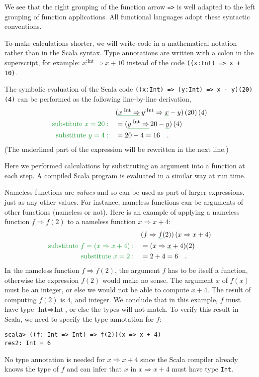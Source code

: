 We see that the right grouping of the function arrow \lstinline!=>!
is well adapted to the left grouping of function applications. All
functional languages adopt these syntactic conventions.

To make calculations shorter, we will write code in a mathematical
notation rather than in the Scala syntax. Type annotations are written
with a colon in the superscript, for example: $x^{:\text{Int}}\Rightarrow x+10$
instead of the code \lstinline!((x:Int) => x + 10)!.

The symbolic evaluation of the Scala code \lstinline!((x:Int) => (y:Int) => x - y)(20)(4)!
can be performed as the following line-by-line derivation,
\begin{align*}
 & (\gunderline{x^{:\text{Int}}\Rightarrow}\,y^{:\text{Int}}\Rightarrow\gunderline x-y)\left(20\right)\left(4\right)\\
{\color{greenunder}\text{substitute }x=20:}\quad & =(\gunderline{y^{:\text{Int}}\Rightarrow}\,20-\gunderline y)\left(4\right)\\
{\color{greenunder}\text{substitute }y=4:}\quad & =20-4=16\quad.
\end{align*}
(The underlined part of the expression will be rewritten in the next
line.)

Here we performed calculations by substituting an argument into a
function at each step. A compiled Scala program is evaluated in a
similar way at run time.

Nameless functions are \emph{values} and so can be used as part of
larger expressions, just as any other values. For instance, nameless
functions can be arguments of other functions (nameless or not). Here
is an example of applying a nameless function $f\Rightarrow f(2)$
to a nameless function $x\Rightarrow x+4$:
\begin{align*}
 & (f\Rightarrow\gunderline f(2))\left(x\Rightarrow x+4\right)\\
{\color{greenunder}\text{substitute }f=\left(x\Rightarrow x+4\right):}\quad & =(x\Rightarrow\gunderline x+4)(2)\\
{\color{greenunder}\text{substitute }x=2:}\quad & =2+4=6\quad.
\end{align*}
In the nameless function $f\Rightarrow f(2)$, the argument $f$ has
to be itself a function, otherwise the expression $f(2)$ would make
no sense. The argument $x$ of $f(x)$ must be an integer, or else
we would not be able to compute $x+4$. The result of computing $f(2)$
is $4$, and integer. We conclude that in this example, $f$ must
have type $\text{Int}\Rightarrow\text{Int}$, or else the types will
not match. To verify this result in Scala, we need to specify the
type annotation for $f$:
\begin{lstlisting}
scala> ((f: Int => Int) => f(2))(x => x + 4)
res2: Int = 6  
\end{lstlisting}
No type annotation is needed for $x\Rightarrow x+4$ since the Scala
compiler already knows the type of $f$ and can infer that $x$ in
$x\Rightarrow x+4$ must have type \lstinline!Int!.

